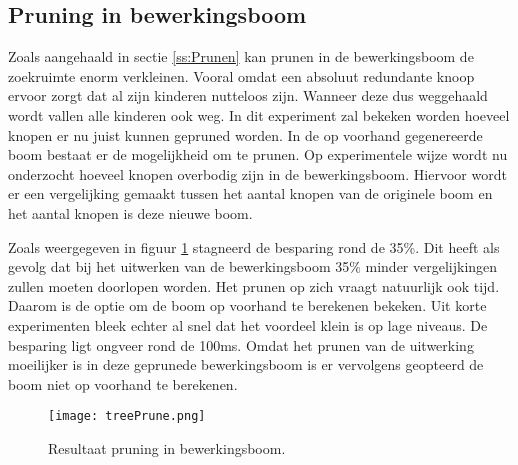 \documentclass[Main.tex]{subfiles}
\begin{document}
\subsection{Pruning in bewerkingsboom}
Zoals aangehaald in sectie \ref{ss:Prunen} kan prunen in de bewerkingsboom de zoekruimte enorm verkleinen. Vooral omdat een absoluut redundante knoop ervoor zorgt dat al zijn kinderen nutteloos zijn. Wanneer deze dus weggehaald wordt vallen alle kinderen ook weg. In dit experiment zal bekeken worden hoeveel knopen er nu juist kunnen gepruned worden.
In de op voorhand gegenereerde boom bestaat er de mogelijkheid om te prunen. Op experimentele wijze wordt nu onderzocht hoeveel knopen overbodig zijn in de bewerkingsboom. Hiervoor wordt er een vergelijking gemaakt tussen het aantal knopen van de originele boom en het aantal knopen is deze nieuwe boom.
\par Zoals weergegeven in figuur \ref{fig:pruningInBewerkingsboom} stagneerd de besparing rond de 35\%. Dit heeft als gevolg dat bij het uitwerken van de bewerkingsboom 35\% minder vergelijkingen zullen moeten doorlopen worden. Het prunen op zich vraagt natuurlijk ook tijd. Daarom is de optie om de boom op voorhand te berekenen bekeken. Uit korte experimenten bleek echter al snel dat het voordeel klein is op lage niveaus. De besparing ligt ongveer rond de 100ms. Omdat het prunen van de uitwerking moeilijker is in deze geprunede bewerkingsboom is er vervolgens geopteerd de boom niet op voorhand te berekenen.
\begin{figure}
\caption{Resultaat pruning in bewerkingsboom.} \label{fig:pruningInBewerkingsboom}
\centering
\texttt{[image: treePrune.png]} 
\end{figure}
\end{document}
